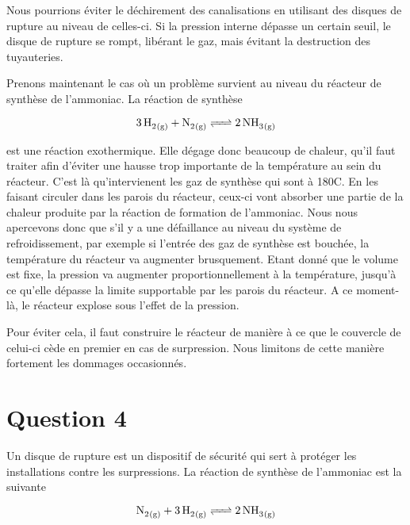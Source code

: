 \documentclass[a4paper,oneside,12pt]{article}
\begin{document}
Nous pourrions éviter le déchirement des canalisations en utilisant des disques de rupture au niveau de celles-ci. Si la pression interne dépasse un certain seuil, le disque de rupture se rompt, libérant le gaz, mais évitant la destruction des tuyauteries.
\newline

Prenons maintenant le cas où un problème survient au niveau du réacteur de synthèse de l'ammoniac. La réaction de synthèse

\begin{equation*}
	\ce{3 \, H2_{(g)} + N2_{(g)} <=> {2} \, NH3_{(g)}} 
\end{equation*}

est une réaction exothermique. Elle dégage donc beaucoup de chaleur, qu'il faut traiter afin d'éviter une hausse trop importante de la température au sein du réacteur. C'est là qu'intervienent les gaz de synthèse  qui sont à 180{\degre}C. En les faisant circuler dans les parois du réacteur, ceux-ci vont absorber une partie de la chaleur produite par la réaction de formation de l'ammoniac. Nous nous apercevons donc que s'il y a une défaillance au niveau du système de refroidissement, par exemple si l'entrée des gaz de synthèse est bouchée, la température du réacteur va augmenter brusquement. Etant donné que le volume est fixe, la pression va augmenter proportionnellement à la température, jusqu'à ce qu'elle dépasse la limite supportable par les parois du réacteur. A ce moment-là, le réacteur explose sous l'effet de la pression.
\newline

Pour éviter cela, il faut construire le réacteur de manière à ce que le couvercle de celui-ci cède en premier en cas de surpression. Nous limitons de cette manière fortement les dommages occasionnés.

\section*{Question 4}

Un disque de rupture est un dispositif de sécurité qui sert à protéger les installations 
contre les surpressions.
La réaction de synthèse de l'ammoniac est la suivante

\[
	\ce{N2_{(g)} + 3H2_{(g)} <=> 2NH3_{(g)}}
\]
\end{document}
